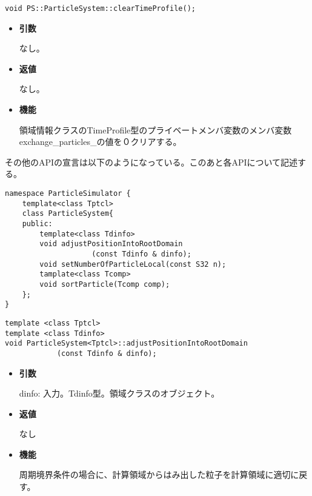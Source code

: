 \begin{screen}
\begin{verbatim}
void PS::ParticleSystem::clearTimeProfile();
\end{verbatim}
\end{screen}

\begin{itemize}

\item {\bf 引数}

なし。

\item {\bf 返値}

なし。

\item {\bf 機能}

領域情報クラスのTimeProfile型のプライベートメンバ変数のメンバ変数
exchange\_particles\_の値を０クリアする。

\end{itemize}





その他のAPIの宣言は以下のようになっている。このあと各APIについて記述す
る。
\begin{lstlisting}[caption=ParticleSystem4]
namespace ParticleSimulator {
    template<class Tptcl>
    class ParticleSystem{
    public:
        template<class Tdinfo>
        void adjustPositionIntoRootDomain
                    (const Tdinfo & dinfo);
        void setNumberOfParticleLocal(const S32 n);
        tamplate<class Tcomp>
        void sortParticle(Tcomp comp);
    };
}
\end{lstlisting}


\begin{screen}
\begin{verbatim}
template <class Tptcl>
template <class Tdinfo>
void ParticleSystem<Tptcl>::adjustPositionIntoRootDomain
            (const Tdinfo & dinfo);
\end{verbatim}
\end{screen}

\begin{itemize}

\item {\bf 引数}

  dinfo: 入力。Tdinfo型。領域クラスのオブジェクト。

\item {\bf 返値}

  なし

\item {\bf 機能}

  周期境界条件の場合に、計算領域からはみ出した粒子を計算領域に適切に戻
  す。

\end{itemize}


